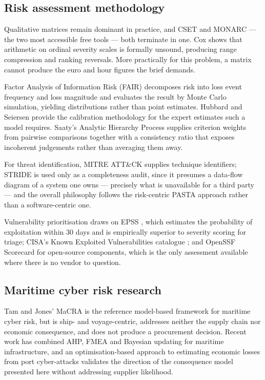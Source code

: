 \documentclass[conference]{IEEEtran}
\begin{document}
\subsection{Risk assessment methodology}

Qualitative matrices remain dominant in practice, and CSET \cite{cset} and MONARC
\cite{monarc} --- the two most accessible free tools --- both terminate in one.
Cox \cite{cox2008} shows that arithmetic on ordinal severity scales is formally
unsound, producing range compression and ranking reversals. More practically for
this problem, a matrix cannot produce the euro and hour figures the brief demands.

Factor Analysis of Information Risk (FAIR) \cite{fair} decomposes risk into loss
event frequency and loss magnitude and evaluates the result by Monte Carlo
simulation, yielding distributions rather than point estimates. Hubbard and
Seiersen \cite{hubbard} provide the calibration methodology for the expert
estimates such a model requires. Saaty's Analytic Hierarchy Process \cite{saaty}
supplies criterion weights from pairwise comparisons together with a consistency
ratio that exposes incoherent judgements rather than averaging them away.

For threat identification, MITRE ATT\&CK \cite{attack} supplies technique
identifiers; STRIDE is used only as a completeness audit, since it presumes a
data-flow diagram of a system one owns --- precisely what is unavailable for a
third party --- and the overall philosophy follows the risk-centric PASTA approach
\cite{pasta} rather than a software-centric one.

Vulnerability prioritisation draws on EPSS \cite{epss}, which estimates the
probability of exploitation within 30 days and is empirically superior to severity
scoring for triage; CISA's Known Exploited Vulnerabilities catalogue \cite{kev};
and OpenSSF Scorecard \cite{scorecard} for open-source components, which is the
only assessment available where there is no vendor to question.

\subsection{Maritime cyber risk research}

Tam and Jones' MaCRA \cite{macra} is the reference model-based framework for
maritime cyber risk, but is ship- and voyage-centric, addresses neither the supply
chain nor economic consequence, and does not produce a procurement decision.
Recent work has combined AHP, FMEA and Bayesian updating for maritime
infrastructure, and an optimisation-based approach to estimating economic losses
from port cyber-attacks \cite{portloss} validates the direction of the consequence
model presented here without addressing supplier likelihood.
\end{document}
